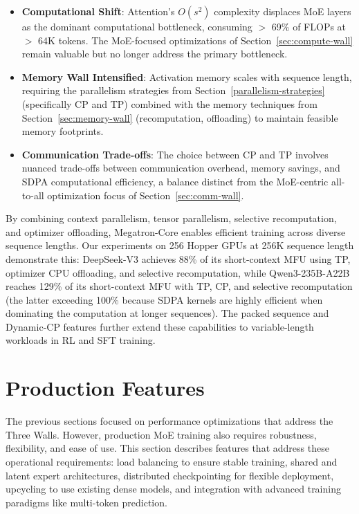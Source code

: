 \begin{itemize}
    \item \textbf{Computational Shift}: Attention's $O(s^2)$ complexity displaces MoE layers as the dominant computational bottleneck, consuming $>$ 69\% of FLOPs at $>$ 64K tokens. The MoE-focused optimizations of Section~\ref{sec:compute-wall} remain valuable but no longer address the primary bottleneck.
    
    \item \textbf{Memory Wall Intensified}: Activation memory scales with sequence length, requiring the parallelism strategies from Section~\ref{parallelism-strategies} (specifically CP and TP) combined with the memory techniques from Section~\ref{sec:memory-wall} (recomputation, offloading) to maintain feasible memory footprints.
    
    \item \textbf{Communication Trade-offs}: The choice between CP and TP involves nuanced trade-offs between communication overhead, memory savings, and SDPA computational efficiency, a balance distinct from the MoE-centric all-to-all optimization focus of Section~\ref{sec:comm-wall}.
\end{itemize}

By combining context parallelism, tensor parallelism, selective recomputation, and optimizer offloading, Megatron-Core enables efficient training across diverse sequence lengths. Our experiments on 256 Hopper GPUs at 256K sequence length demonstrate this: DeepSeek-V3 achieves 88\% of its short-context MFU using TP, optimizer CPU offloading, and selective recomputation, while Qwen3-235B-A22B reaches 129\% of its short-context MFU with TP, CP, and selective recomputation (the latter exceeding 100\% because SDPA kernels are highly efficient when dominating the computation at longer sequences). The packed sequence and Dynamic-CP features further extend these capabilities to variable-length workloads in RL and SFT training.



\section{Production Features}\label{sec:production-features}

The previous sections focused on performance optimizations that address the Three Walls. However, production MoE training also requires robustness, flexibility, and ease of use. This section describes features that address these operational requirements: load balancing to ensure stable training, shared and latent expert architectures, distributed checkpointing for flexible deployment, upcycling to use existing dense models, and integration with advanced training paradigms like multi-token prediction.

